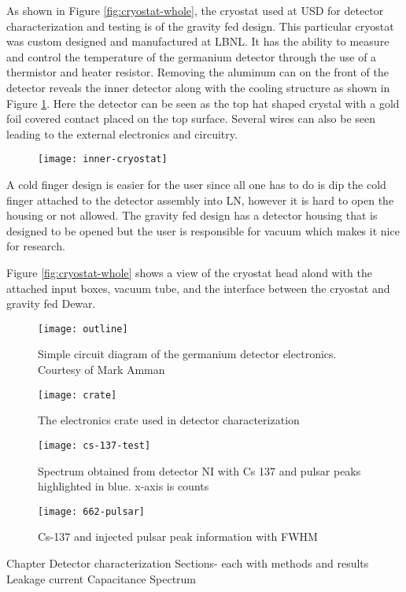 As shown in Figure \ref{fig:cryostat-whole}, the cryostat used at USD for detector characterization and testing is of the gravity fed design.
This particular cryostat was custom designed and manufactured at LBNL.
It has the ability to measure and control the temperature of the germanium detector through the use of a thermistor and heater resistor.
Removing the aluminum can on the front of the detector reveals the inner detector along with the cooling structure as shown in Figure \ref{fig:inner-cryostat}.
Here the detector can be seen as the top hat shaped crystal with a gold foil covered contact placed on the top surface.
Several wires can also be seen leading to the external electronics and circuitry.
\begin{figure}[htpb]
\centering
\texttt{[image: inner-cryostat]}
\caption{}
\label{fig:inner-cryostat}
\end{figure}
A cold finger design is easier for the user since all one has to do is dip the cold finger attached to the detector assembly into LN, however it is hard to open the housing or not allowed.
The gravity fed design has a detector housing that is designed to be opened but the user is responsible for vacuum which makes it nice for research.

Figure \ref{fig:cryostat-whole} shows a view of the cryostat head alond with the attached input boxes, vacuum tube, and the interface between the cryostat and gravity fed Dewar.


\begin{figure}[htpb]
\centering
\texttt{[image: outline]}
\caption{Simple circuit diagram of the germanium detector electronics. Courtesy of Mark Amman}
\label{fig:outline}
\end{figure}

\begin{figure}[htpb]
\centering
\texttt{[image: crate]}
\caption{The electronics crate used in detector characterization}
\label{fig:crate}
\end{figure}

\begin{figure}[htpb]
\centering
\texttt{[image: cs-137-test]}
\caption{Spectrum obtained from detector NI with Cs 137 and pulsar peaks highlighted in blue. x-axis is counts}
\label{fig:cs-137-test}
\end{figure}

\begin{figure}[htpb]
\centering
\texttt{[image: 662-pulsar]}
\caption{Cs-137 and injected pulsar peak information with FWHM}
\label{fig:662-pulsar}
\end{figure}



Chapter Detector characterization
Sections- each with methods and results
Leakage current
Capacitance
Spectrum

